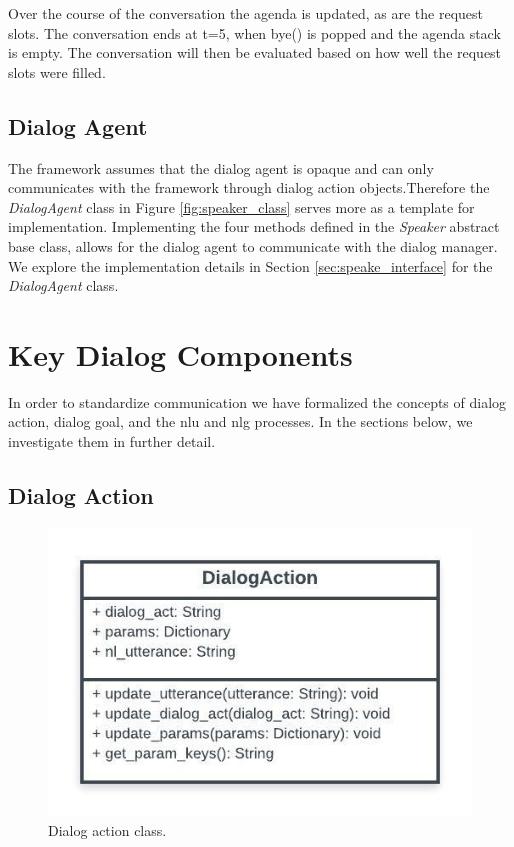 Over the course of the conversation the agenda is updated, as are the request slots. The conversation ends at t=5, when bye() is popped and the agenda stack is empty. The conversation will then be evaluated based on how well the request slots were filled.

\subsection{Dialog Agent}
The framework assumes that the dialog agent is opaque and can only communicates with the framework through dialog action objects.Therefore the \textit{DialogAgent} class in Figure \ref{fig:speaker_class} serves more as a template for implementation. Implementing the four methods defined in the \textit{Speaker} abstract base class, allows for the dialog agent to communicate with the dialog manager. We explore the implementation details in Section \ref{sec:speake_interface} for the \textit{DialogAgent} class.

\section{Key Dialog Components}
In order to standardize communication we have formalized the concepts of dialog action, dialog goal, and the nlu and nlg processes. In the sections below, we investigate them in further detail.

\subsection{Dialog Action}
\label{sssec:dialog_action}

\begin{figure}[h!]
	\centering
	\includegraphics[scale=1]{diagrams/dialog_action.jpeg}
	\caption{ Dialog action class. }
	\label{fig:dialog_action_class}
\end{figure}

